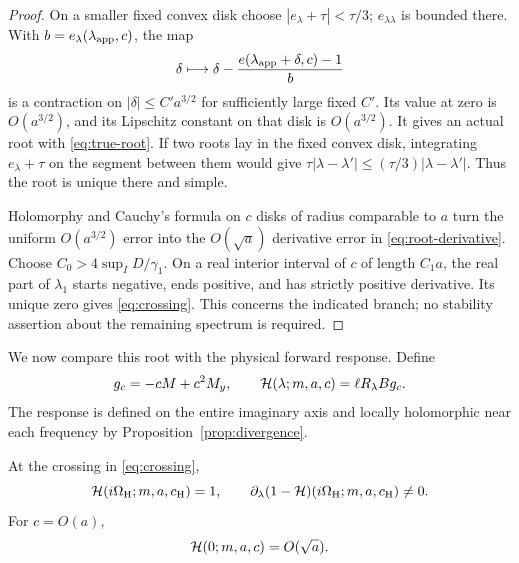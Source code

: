 \begin{proof}
On a smaller fixed convex disk choose
$|e_\lambda+\tau|<\tau/3$; $e_{\lambda\lambda}$ is bounded there.
With $b=e_\lambda(\lambda_{\rm app},c)$, the map
\[
 \delta\longmapsto
 \delta-\frac{e(\lambda_{\rm app}+\delta,c)-1}{b}
\]
is a contraction on $|\delta|\le C'a^{3/2}$ for sufficiently large
fixed $C'$. Its value at zero is $O(a^{3/2})$, and its Lipschitz
constant on that disk is $O(a^{3/2})$. It gives an actual root with
\eqref{eq:true-root}. If two roots lay in the fixed convex disk,
integrating $e_\lambda+\tau$ on the segment between them would give
$\tau|\lambda-\lambda'|\le(\tau/3)|\lambda-\lambda'|$.
Thus the root is unique there and simple.

Holomorphy and Cauchy's formula on $c$ disks of radius comparable to
$a$ turn the uniform $O(a^{3/2})$ error into the $O(\sqrt a)$ derivative
error in \eqref{eq:root-derivative}. Choose
$C_0>4\sup_I D/\gamma_1$. On a real interior interval of $c$ of
length $C_1a$, the real part of $\lambda_1$ starts negative, ends
positive, and has strictly positive derivative. Its unique zero
gives \eqref{eq:crossing}. This concerns the indicated branch;
no stability assertion about the remaining spectrum is required.
\end{proof}

We now compare this root with the physical forward response. Define
\begin{equation}\label{eq:physical-response}
 g_c=-cM+c^2M_y,\qquad
 \mathcal H(\lambda;m,a,c)=\ell R_\lambda Bg_c .
\end{equation}
The response is defined on the entire imaginary axis and locally
holomorphic near each frequency by Proposition~\ref{prop:divergence}.

\begin{proposition}\label{prop:response-crossing}
At the crossing in \eqref{eq:crossing},
\begin{equation}\label{eq:response-root}
 \mathcal H(i\Omega_{\mathrm H};m,a,c_{\mathrm H})=1,\qquad
 \partial_\lambda(1-\mathcal H)(i\Omega_{\mathrm H};m,a,c_{\mathrm H})\ne0.
\end{equation}
For $c=O(a)$,
\begin{equation}\label{eq:static-response}
 \mathcal H(0;m,a,c)=O(\sqrt a).
\end{equation}
\end{proposition}

